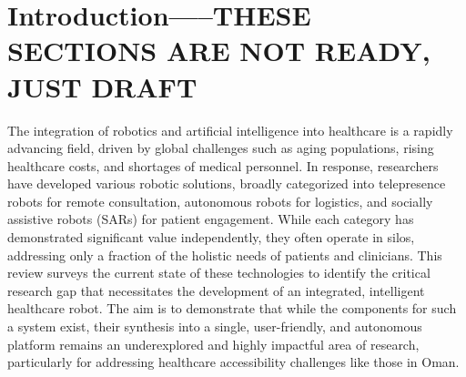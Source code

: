 \section{Introduction-----THESE SECTIONS ARE NOT READY, JUST DRAFT}



The integration of robotics and artificial intelligence into healthcare is a rapidly advancing field, driven by global challenges such as aging populations, rising healthcare costs, and shortages of medical personnel. In response, researchers have developed various robotic solutions, broadly categorized into telepresence robots for remote consultation, autonomous robots for logistics, and socially assistive robots (SARs) for patient engagement. While each category has demonstrated significant value independently, they often operate in silos, addressing only a fraction of the holistic needs of patients and clinicians. This review surveys the current state of these technologies to identify the critical research gap that necessitates the development of an integrated, intelligent healthcare robot. The aim is to demonstrate that while the components for such a system exist, their synthesis into a single, user-friendly, and autonomous platform remains an underexplored and highly impactful area of research, particularly for addressing healthcare accessibility challenges like those in Oman.
